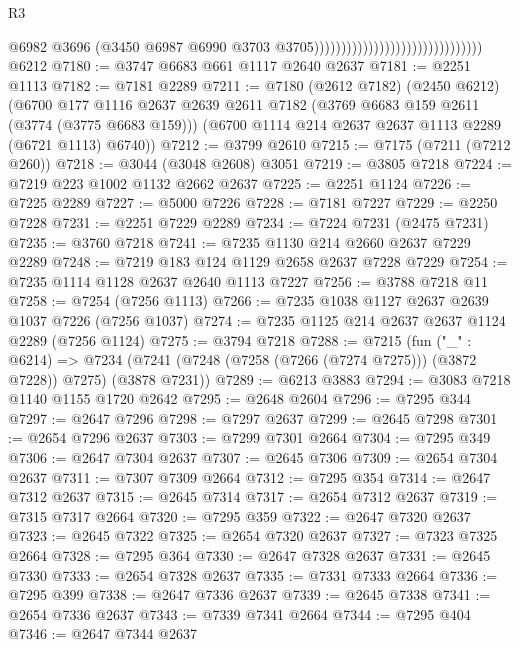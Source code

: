 \begin{lexlean}{R3}
\begin{coremodule}
                                                                @6982
                                                                @3696
                                                                (@3450
                                                                  @6987
                                                                  @6990
                                                                  @3703
                                                                  @3705)))))))))))))))))))))))))))))))
    @6212
@7180 := @3747 @6683 @661 @1117 @2640 @2637
@7181 := @2251 @1113
@7182 := @7181 @2289
@7211 := @7180
    (@2612 @7182)
    (@2450 @6212)
    (@6700
      @177
      @1116
      @2637
      @2639
      @2611
      @7182
      (@3769 @6683 @159 @2611 (@3774 (@3775 @6683 @159)))
      (@6700 @1114 @214 @2637 @2637 @1113 @2289 (@6721 @1113) @6740))
@7212 := @3799 @2610
@7215 := @7175 (@7211 (@7212 @260))
@7218 := @3044 (@3048 @2608) @3051
@7219 := @3805 @7218
@7224 := @7219 @223 @1002 @1132 @2662 @2637
@7225 := @2251 @1124
@7226 := @7225 @2289
@7227 := @5000 @7226
@7228 := @7181 @7227
@7229 := @2250 @7228
@7231 := @2251 @7229 @2289
@7234 := @7224 @7231 (@2475 @7231)
@7235 := @3760 @7218
@7241 := @7235 @1130 @214 @2660 @2637 @7229 @2289
@7248 := @7219 @183 @124 @1129 @2658 @2637 @7228 @7229
@7254 := @7235 @1114 @1128 @2637 @2640 @1113 @7227
@7256 := @3788 @7218 @11
@7258 := @7254 (@7256 @1113)
@7266 := @7235 @1038 @1127 @2637 @2639 @1037 @7226 (@7256 @1037)
@7274 := @7235 @1125 @214 @2637 @2637 @1124 @2289 (@7256 @1124)
@7275 := @3794 @7218
@7288 := @7215
    (fun ("_" : @6214) =>
    @7234 (@7241 (@7248 (@7258 (@7266 (@7274 @7275))) (@3872 @7228)) @7275) (@3878 @7231))
@7289 := @6213 @3883
@7294 := @3083 @7218 @1140 @1155 @1720 @2642
@7295 := @2648 @2604
@7296 := @7295 @344
@7297 := @2647 @7296
@7298 := @7297 @2637
@7299 := @2645 @7298
@7301 := @2654 @7296 @2637
@7303 := @7299 @7301 @2664
@7304 := @7295 @349
@7306 := @2647 @7304 @2637
@7307 := @2645 @7306
@7309 := @2654 @7304 @2637
@7311 := @7307 @7309 @2664
@7312 := @7295 @354
@7314 := @2647 @7312 @2637
@7315 := @2645 @7314
@7317 := @2654 @7312 @2637
@7319 := @7315 @7317 @2664
@7320 := @7295 @359
@7322 := @2647 @7320 @2637
@7323 := @2645 @7322
@7325 := @2654 @7320 @2637
@7327 := @7323 @7325 @2664
@7328 := @7295 @364
@7330 := @2647 @7328 @2637
@7331 := @2645 @7330
@7333 := @2654 @7328 @2637
@7335 := @7331 @7333 @2664
@7336 := @7295 @399
@7338 := @2647 @7336 @2637
@7339 := @2645 @7338
@7341 := @2654 @7336 @2637
@7343 := @7339 @7341 @2664
@7344 := @7295 @404
@7346 := @2647 @7344 @2637

\end{coremodule}
\end{lexlean}
